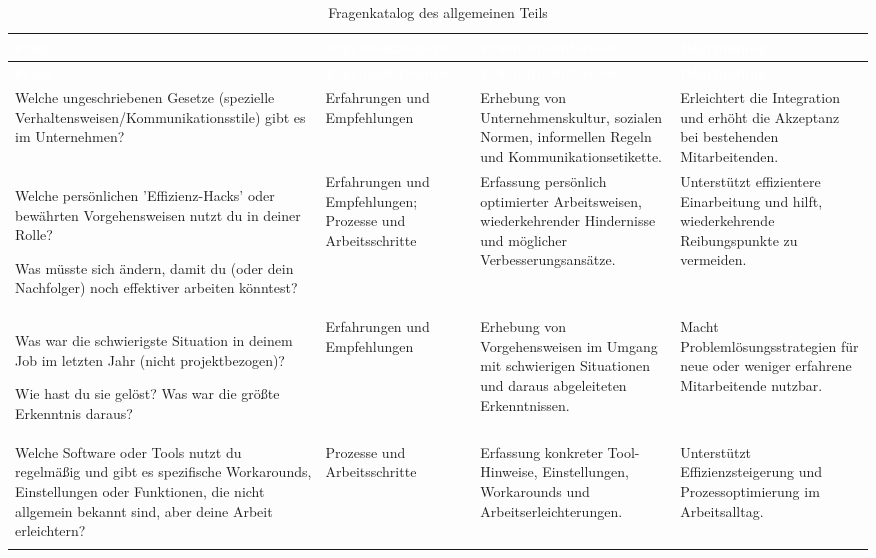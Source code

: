 \documentclass[
  10pt,
  ngerman,
  a4paper,
  toc=graduated,
  numbers=noenddot,
  headings=standardclasses,
  nonumberlist
]{scrartcl}
\begin{document}
\begin{longtable}{|L{4.9cm}|L{3.1cm}|L{3.8cm}|L{3.3cm}|}
\hline
{}
\textcolor{white}{\textbf{Frage}} &
\textcolor{white}{\textbf{Ergebniskategorie}} &
\textcolor{white}{\textbf{Erkenntnisinteresse}} &
\textcolor{white}{\textbf{Begründung}} \\
\hline
\endfirsthead

\hline
{}
\textcolor{white}{\textbf{Frage}} &
\textcolor{white}{\textbf{Ergebniskategorie}} &
\textcolor{white}{\textbf{Erkenntnisinteresse}} &
\textcolor{white}{\textbf{Begründung}} \\
\hline
\endhead

Welche ungeschriebenen Gesetze (spezielle Verhaltensweisen/Kommunikationsstile) gibt es im Unternehmen?
& Erfahrungen und Empfehlungen
& Erhebung von Unternehmenskultur, sozialen Normen, informellen Regeln und Kommunikationsetikette.
& Erleichtert die Integration und erhöht die Akzeptanz bei bestehenden Mitarbeitenden. \\
\hline

Welche persönlichen 'Effizienz-Hacks' oder bewährten Vorgehensweisen nutzt du in deiner Rolle?

Was müsste sich ändern, damit du (oder dein Nachfolger) noch effektiver arbeiten könntest?
& Erfahrungen und Empfehlungen; Prozesse und Arbeitsschritte
& Erfassung persönlich optimierter Arbeitsweisen, wiederkehrender Hindernisse und möglicher Verbesserungsansätze.
& Unterstützt effizientere Einarbeitung und hilft, wiederkehrende Reibungspunkte zu vermeiden. \\
\hline

Was war die schwierigste Situation in deinem Job im letzten Jahr (nicht projektbezogen)? 

Wie hast du sie gelöst? Was war die größte Erkenntnis daraus?
& Erfahrungen und Empfehlungen
& Erhebung von Vorgehensweisen im Umgang mit schwierigen Situationen und daraus abgeleiteten Erkenntnissen.
& Macht Problemlösungsstrategien für neue oder weniger erfahrene Mitarbeitende nutzbar. \\
\hline

Welche Software oder Tools nutzt du regelmäßig und gibt es spezifische Workarounds, Einstellungen oder Funktionen, die nicht allgemein bekannt sind, aber deine Arbeit erleichtern?
& Prozesse und Arbeitsschritte
& Erfassung konkreter Tool-Hinweise, Einstellungen, Workarounds und Arbeitserleichterungen.
& Unterstützt Effizienzsteigerung und Prozessoptimierung im Arbeitsalltag. \\
\hline
\caption{Fragenkatalog des allgemeinen Teils}
\label{tab:fragenkatalog_teil_1}
\end{longtable}
\end{document}
